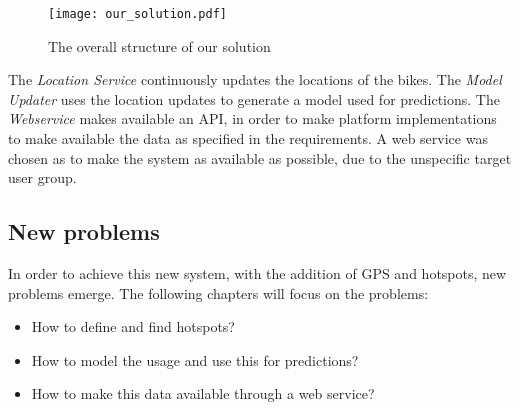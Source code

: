 \begin{figure}[h]
\texttt{[image: our\_solution.pdf]}
\caption{The overall structure of our solution}
\label{fig:solution_structure}
\end{figure}

The \textit{Location Service} continuously updates the locations of the bikes.
The \textit{Model Updater} uses the location updates to generate a model used for predictions.
The \textit{Webservice} makes available an API, in order to make platform implementations to make available the data as specified in the requirements.
A web service was chosen as to make the system as available as possible, due to the unspecific target user group.

\subsection{New problems}
In order to achieve this new system, with the addition of GPS and hotspots, new problems emerge.
The following chapters will focus on the problems:
\begin{itemize}
\item How to define and find hotspots?
\item How to model the usage and use this for predictions?
\item How to make this data available through a web service?
\end{itemize}